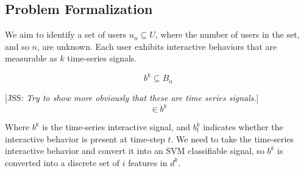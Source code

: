 \documentclass{article}
\newcommand{\meta}[1]{{\textcolor[rgb]{0.1,0.7,0.2}{[JSS: {\it #1}]}}}
\begin{document}

\subsection{Problem Formalization}

We aim to identify a set of users $u_n \subseteq U$, where the number of users in the set, and so $n$, are unknown. Each user exhibits interactive behaviors that are measurable as $k$ time-series signals.

\begin{equation}
    b^k \subseteq B_n
\end{equation}

\meta{Try to show more obviously that these are time series signals.}
\begin{equation}
    [b^k_0 ... b^k_f] \in b^k
\end{equation}

Where $b^k$ is the time-series interactive signal, and $b^k_t$ indicates whether the interactive behavior is present at time-step $t$. We need to take the time-series interactive behavior and convert it into an SVM classifiable signal, so $b^k$ is converted into a discrete set of $i$ features in $d^k$.
\end{document}
